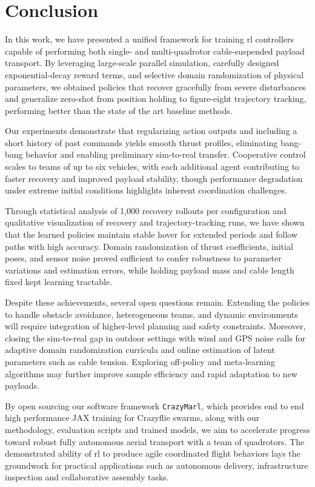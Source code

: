 \chapter{Conclusion}

In this work, we have presented a unified framework for training \gls{rl} controllers capable of performing both single- and multi-quadrotor cable-suspended payload transport. By leveraging large-scale parallel simulation, carefully designed exponential-decay reward terms, and selective domain randomization of physical parameters, we obtained policies that recover gracefully from severe disturbances and generalize zero-shot from position holding to figure-eight trajectory tracking, performing better than the state of the art baseline methods.

Our experiments demonstrate that regularizing action outputs and including a short history of past commands yields smooth thrust profiles, eliminating bang-bang behavior and enabling preliminary sim-to-real transfer. Cooperative control scales to teams of up to six vehicles, with each additional agent contributing to faster recovery and improved payload stability, though performance degradation under extreme initial conditions highlights inherent coordination challenges.

Through statistical analysis of 1,000 recovery rollouts per configuration and qualitative visualization of recovery and trajectory-tracking runs, we have shown that the learned policies maintain stable hover for extended periods and follow paths with high accuracy. Domain randomization of thrust coefficients, initial poses, and sensor noise proved sufficient to confer robustness to parameter variations and estimation errors, while holding payload mass and cable length fixed kept learning tractable.

Despite these achievements, several open questions remain. Extending the policies to handle obstacle avoidance, heterogeneous teams, and dynamic environments will require integration of higher-level planning and safety constraints. Moreover, closing the sim-to-real gap in outdoor settings with wind and GPS noise calls for adaptive domain randomization curricula and online estimation of latent parameters such as cable tension. Exploring off-policy and meta-learning algorithms may further improve sample efficiency and rapid adaptation to new payloads.

By open sourcing our software framework \texttt{CrazyMarl}, which provides end to end high performance JAX training for Crazyflie swarms, along with our methodology, evaluation scripts and trained models, we aim to accelerate progress toward robust fully autonomous aerial transport with a team of quadrotors. The demonstrated ability of \gls{rl} to produce agile coordinated flight behaviors lays the groundwork for practical applications such as autonomous delivery, infrastructure inspection and collaborative assembly tasks.